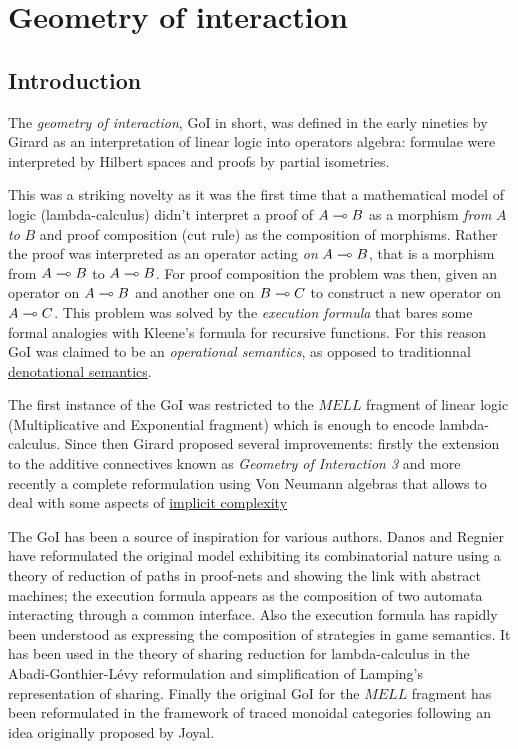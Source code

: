 \chapter{Geometry of interaction}\label{geometry-of-interaction}

\section{Introduction}

The \emph{geometry of interaction}, GoI in short, was defined in the
early nineties by Girard as an interpretation of linear logic into
operators algebra: formulae were interpreted by Hilbert spaces and
proofs by partial isometries.

This was a striking novelty as it was the first time that a mathematical
model of logic (lambda-calculus) didn't interpret a proof of
\(A\multimap B\) as a morphism \emph{from} \(A\) \emph{to} \(B\) and proof
composition (cut rule) as the composition of morphisms. Rather the proof
was interpreted as an operator acting \emph{on} \(A\multimap B\), that is a
morphism from \(A\multimap B\) to \(A\multimap B\). For proof composition the
problem was then, given an operator on \(A\multimap B\) and another one on
\(B\multimap C\) to construct a new operator on \(A\multimap C\). This problem
was solved by the \emph{execution formula} that bares some formal
analogies with Kleene's formula for recursive functions. For this reason
GoI was claimed to be an \emph{operational semantics}, as opposed to
traditionnal \hyperref[semantics]{denotational semantics}.

The first instance of the GoI was restricted to the \(MELL\) fragment of
linear logic (Multiplicative and Exponential fragment) which is enough
to encode lambda-calculus. Since then Girard proposed several
improvements: firstly the extension to the additive connectives known as
\emph{Geometry of Interaction 3} and more recently a complete
reformulation using Von Neumann algebras that allows to deal with some
aspects of \hyperref[light-linear-logics]{implicit complexity}

The GoI has been a source of inspiration for various authors. Danos and
Regnier have reformulated the original model exhibiting its
combinatorial nature using a theory of reduction of paths in proof-nets
and showing the link with abstract machines; the execution formula
appears as the composition of two automata interacting through a common
interface. Also the execution formula has rapidly been understood as
expressing the composition of strategies in game semantics. It has been
used in the theory of sharing reduction for lambda-calculus in the
Abadi-Gonthier-Lévy reformulation and simplification of Lamping's
representation of sharing. Finally the original GoI for the \(MELL\)
fragment has been reformulated in the framework of traced monoidal
categories following an idea originally proposed by Joyal.


